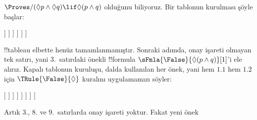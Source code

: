 \documentclass[../../../include/open-logic-section]{subfiles}
\begin{document}
{
\begin{ex}
  $\Proves/ (\Diamond p \land \Diamond q) \lif \Diamond(p \land q)$
  olduğunu biliyoruz. Bir tablonun kurulması şöyle başlar:
  \begin{oltableau}
    [\pFmla{\False}{(\Diamond p \land \Diamond q) \lif \Diamond(p \land q)}{1},
      just = \TAss, checked
      [\pFmla{\True}{\Diamond p \land \Diamond q}{1},
        just = {\TRule{\False}{\lif}[1]}, checked
        [\pFmla{\False}{\Diamond(p \land q)}{1},
          just = {\TRule{\False}{\lif}[1]}
          [\pFmla{\True}{\Diamond p}{1},
            just = {\TRule{\True}{\land}[2]}, checked
            [\pFmla{\True}{\Diamond q}{1},
              just = {\TRule{\True}{\land}[2]}, checked
              [\pFmla{\True}{p}{1.1}, 
                just = {\TRule{\True}{\Diamond}[4]}, checked
                [\pFmla{\True}{q}{1.2}, 
                  just = {\TRule{\True}{\Diamond}[5]}, checked
                ]
              ]
            ]
          ]
        ]
      ]
    ]
  \end{oltableau}
  !!{tableau} elbette henüz tamamlanmamıştır. Sonraki adımda, onay işareti
  olmayan tek satırı, yani $3$.~satırdaki önekli !!{formula}
  $\sFmla{\False}{\Diamond(p \land q)}[1]$'i ele alırız. Kapalı tablonun
  kuruluşu, dalda kullanılan her önek, yani hem $1.1$ hem $1.2$ için
  $\TRule{\False}{\Diamond}$ kuralını uygulamamızı söyler:
  \begin{oltableau}
    [\pFmla{\False}{(\Diamond p \land \Diamond q) \lif \Diamond(p \land q)}{1},
      just = \TAss, checked
      [\pFmla{\True}{\Diamond p \land \Diamond q}{1},
        just = {\TRule{\False}{\lif}[1]}, checked
        [\pFmla{\False}{\Diamond (p \land q)}{1},
          just = {\TRule{\False}{\lif}[1]}
          [\pFmla{\True}{\Diamond p}{1},
            just = {\TRule{\True}{\land}[2]}, checked
            [\pFmla{\True}{\Diamond q}{1},
              just = {\TRule{\True}{\land}[2]}, checked
              [\pFmla{\True}{p}{1.1}, 
                just = {\TRule{\True}{\Diamond}[4]}, checked
                [\pFmla{\True}{q}{1.2}, 
                  just = {\TRule{\True}{\Diamond}[5]}, checked
                  [\pFmla{\False}{p \land q}{1.1}, 
                    just = {\TRule{\False}{\Diamond}[3]}
                    [\pFmla{\False}{p \land q}{1.2}, 
                      just = {\TRule{\False}{\Diamond}[3]}
                    ]
                  ]
                ]
              ]
            ]
          ]
        ]
      ]
    ]
  \end{oltableau}
  Artık 3., 8. ve 9.~satırlarda onay işareti yoktur. Fakat yeni önek

\end{ex}}
\end{document}
